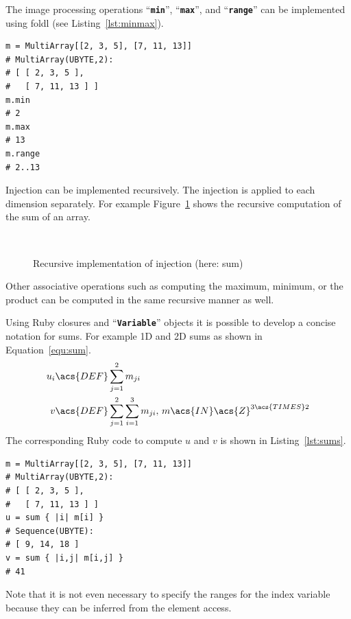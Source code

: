 \documentclass[12pt,a4paper,oneside,openright]{book}
\newcommand{\Eg}{For ex\-am\-ple }
\newcommand{\equ}[1]{Equation~\ref{equ:#1}}
\newcommand{\fig}[1]{Figure~\ref{fig:#1}}
\newcommand{\lst}[1]{Listing~\ref{lst:#1}}
\newcommand{\code}[1]{``\texttt{\textbf{\textcolor{codegray}{\small{#1}}}}''}
\begin{document}
\begin{CJK}{UTF8}{}
The image processing operations \code{min}, \code{max}, and \code{range} can be implemented using \ac{foldl} (see \lst{minmax}).
\lstset{language=Ruby,frame=single,numbers=none}
\begin{lstlisting}[float=htbp,caption={Various cumulative operations based on injections},escapechar=\$,label=lst:minmax]
m = MultiArray[[2, 3, 5], [7, 11, 13]]
# MultiArray(UBYTE,2):
# [ [ 2, 3, 5 ],
#   [ 7, 11, 13 ] ]
m.min
# 2
m.max
# 13
m.range
# 2..13
\end{lstlisting}
Injection can be implemented recursively. The injection is applied to each dimension separately. \Eg \fig{sum} shows the recursive computation of the sum of an array.
\begin{figure}[htbp]
   \begin{center}
     \\
     \caption{Recursive implementation of injection (here: sum)\label{fig:sum}}
   \end{center}
\end{figure}
Other associative operations such as computing the maximum, minimum, or the product can be computed in the same recursive manner as well.

Using Ruby closures and \code{Variable} objects it is possible to develop a concise notation for sums. \Eg \ac{1D} and \ac{2D} sums as shown in \equ{sum}.
\begin{align}\label{equ:sum}
  \begin{split}
    u_i&\acs{DEF}\displaystyle\sum_{j=1}^2 m_{ji}\\
    v&\acs{DEF}\displaystyle\sum_{j=1}^2\sum_{i=1}^3 m_{ji}\mathrm{,\ }m\acs{IN}\acs{Z}^{3\acs{TIMES} 2}
  \end{split}
\end{align}
The corresponding Ruby code to compute $u$ and $v$ is shown in \lst{sums}.
\lstset{language=Ruby,frame=single,numbers=none}
\begin{lstlisting}[float=htbp,caption={Concise notation for sums of elements},escapechar=\$,label=lst:sums]
m = MultiArray[[2, 3, 5], [7, 11, 13]]
# MultiArray(UBYTE,2):
# [ [ 2, 3, 5 ],
#   [ 7, 11, 13 ] ]
u = sum { |i| m[i] }
# Sequence(UBYTE):
# [ 9, 14, 18 ]
v = sum { |i,j| m[i,j] }
# 41
\end{lstlisting}
Note that it is not even necessary to specify the ranges for the index variable because they can be inferred from the element access.


\end{CJK}
\end{document}
